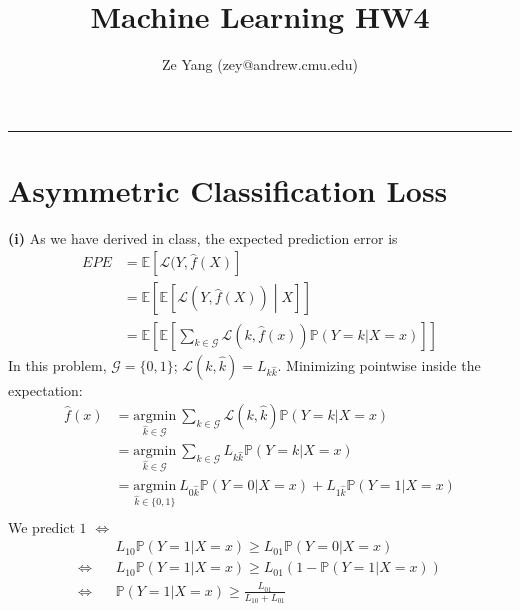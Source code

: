 \documentclass[11pt]{article}
\title{Machine Learning HW4}
\author{Ze Yang (zey@andrew.cmu.edu)}
\begin{document}
    
    
    \maketitle
    
    \noindent\rule{16cm}{0.4pt}
\section{Asymmetric Classification Loss}
 \textbf{(i)} As we have derived in class, the expected prediction error is
\begin{equation}
    \begin{split}
        EPE &= \mathbb{E}\left[\mathcal{L}(Y,\hat{f}(X)\right] \\
        &= \mathbb{E}\left[\mathbb{E}\left[\mathcal{L}(Y,\hat{f}(X)) \middle| X\right] \right]\\
        &= \mathbb{E}\left[\mathbb{E}\left[\sum_{k\in \mathcal{G}} \mathcal{L}(k,\hat{f}(x)) \mathbb{P}\left(Y=k|X=x\right)  \right] \right]
    \end{split}
\end{equation}
In this problem, $\mathcal{G}=\{0,1\}$; $\mathcal{L}(k, \hat{k}) = L_{k\hat{k}}$. Minimizing pointwise inside the expectation:
\begin{equation}
    \begin{split}
        \hat{f}(x) &= \underset{\hat{k} \in \mathcal{G}}{\mathrm{argmin}}~ \sum_{k\in \mathcal{G}}\mathcal{L}(k,\hat{k}) \mathbb{P}\left(Y=k|X=x\right)\\
        &= \underset{\hat{k}\in \mathcal{G}}{\mathrm{argmin}}~ \sum_{k\in \mathcal{G}} L_{k\hat{k}} \mathbb{P}\left(Y=k|X=x\right)\\
        &=\underset{\hat{k}\in \{0,1\}}{\mathrm{argmin}}~  L_{0\hat{k}} \mathbb{P}\left(Y=0|X=x\right) + L_{1\hat{k}} \mathbb{P}\left(Y=1|X=x\right)\\
    \end{split}
\end{equation}
We predict $1$ $\iff$ 
\begin{equation}
    \begin{split}
        &L_{10} \mathbb{P}\left(Y=1|X=x\right) \geq L_{01} \mathbb{P}\left(Y=0|X=x\right)  \\
        \iff~~~~&L_{10}\mathbb{P}\left(Y=1|X=x\right) \geq L_{01}\left(1- \mathbb{P}\left(Y=1|X=x\right)\right)\\
        \iff~~~~&\mathbb{P}\left(Y=1|X=x\right)\geq \frac{L_{01}}{L_{10}+L_{01}}
    \end{split}
\end{equation}
\end{document}
